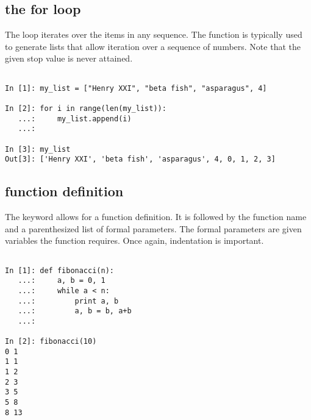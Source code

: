 \subsection*{the for loop}
\begin{example}

The  loop iterates over the items in any sequence. 
The  function is typically used to generate lists that allow iteration 
over a sequence of numbers. Note that the given stop value is never attained. 

\begin{lstlisting}

In [1]: my_list = ["Henry XXI", "beta fish", "asparagus", 4]

In [2]: for i in range(len(my_list)):
   ...:     my_list.append(i)
   ...:     

In [3]: my_list
Out[3]: ['Henry XXI', 'beta fish', 'asparagus', 4, 0, 1, 2, 3]

\end{lstlisting}
\end{example}


\subsection*{function definition}
\begin{example}

The  keyword allows for a function definition. It is followed by 
the function name and a parenthesized list of formal parameters.
The formal parameters are given variables the function requires. 
Once again, indentation is important. 

\begin{lstlisting}

In [1]: def fibonacci(n):
   ...:     a, b = 0, 1
   ...:     while a < n:
   ...:         print a, b
   ...:         a, b = b, a+b
   ...:         

In [2]: fibonacci(10)
0 1
1 1
1 2
2 3
3 5
5 8
8 13

\end{lstlisting}
\end{example}

